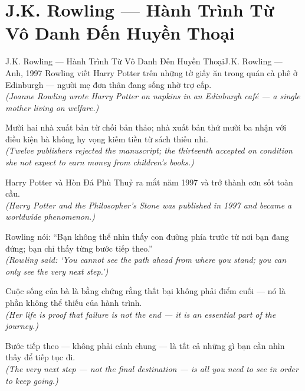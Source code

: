 \section{J.K. Rowling --- Hành Trình Từ Vô Danh Đến Huyền Thoại}
\begin{truyen}{J.K. Rowling --- Hành Trình Từ Vô Danh Đến Huyền Thoại}{J.K. Rowling --- Anh, 1997}
 Rowling viết Harry Potter trên những tờ giấy ăn trong quán cà phê ở Edinburgh --- người mẹ đơn thân đang sống nhờ trợ cấp.\\[4pt]
\textit{(Joanne Rowling wrote Harry Potter on napkins in an Edinburgh café --- a single mother living on welfare.)}

Mười hai nhà xuất bản từ chối bản thảo; nhà xuất bản thứ mười ba nhận với điều kiện bà không hy vọng kiếm tiền từ sách thiếu nhi.\\[4pt]
\textit{(Twelve publishers rejected the manuscript; the thirteenth accepted on condition she not expect to earn money from children's books.)}

Harry Potter và Hòn Đá Phù Thuỷ ra mắt năm 1997 và trở thành cơn sốt toàn cầu.\\[4pt]
\textit{(Harry Potter and the Philosopher's Stone was published in 1997 and became a worldwide phenomenon.)}

Rowling nói: ``Bạn không thể nhìn thấy con đường phía trước từ nơi bạn đang đứng; bạn chỉ thấy từng bước tiếp theo.''\\[4pt]
\textit{(Rowling said: `You cannot see the path ahead from where you stand; you can only see the very next step.')}

Cuộc sống của bà là bằng chứng rằng thất bại không phải điểm cuối --- nó là phần không thể thiếu của hành trình.\\[4pt]
\textit{(Her life is proof that failure is not the end --- it is an essential part of the journey.)}

\end{truyen}
\begin{baihoc}
  Bước tiếp theo --- không phải cánh chung --- là tất cả những gì bạn cần nhìn thấy để tiếp tục đi.\\[4pt]
  \textit{(The very next step --- not the final destination --- is all you need to see in order to keep going.)}
\end{baihoc}

